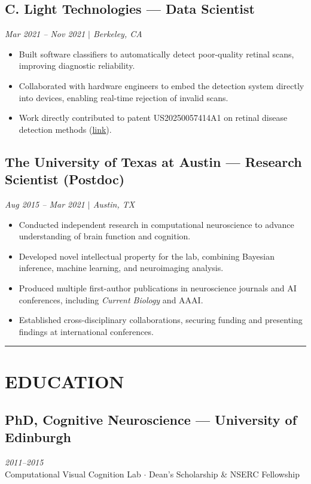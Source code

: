 \documentclass[11pt,a4paper]{article}
\newcommand{\sepline}{\noindent\rule{\textwidth}{0.5pt}\vspace{0.5em}}
\begin{document}
\subsection*{C. Light Technologies --- Data Scientist}
\textit{Mar 2021 -- Nov 2021 $\mid$ Berkeley, CA}
\begin{itemize}
    \item Built software classifiers to automatically detect poor-quality retinal scans, improving diagnostic reliability.
    \item Collaborated with hardware engineers to embed the detection system directly into devices, enabling real-time rejection of invalid scans.
    \item Work directly contributed to patent US20250057414A1 on retinal disease detection methods (\href{https://patents.google.com/patent/US20250057414A1/}{link}).
\end{itemize}

\subsection*{The University of Texas at Austin --- Research Scientist (Postdoc)}
\textit{Aug 2015 -- Mar 2021 $\mid$ Austin, TX}
\begin{itemize}
    \item Conducted independent research in computational neuroscience to advance understanding of brain function and cognition.
    \item Developed novel intellectual property for the lab, combining Bayesian inference, machine learning, and neuroimaging analysis.
    \item Produced multiple first-author publications in neuroscience journals and AI conferences, including \textit{Current Biology} and AAAI.
    \item Established cross-disciplinary collaborations, securing funding and presenting findings at international conferences.
\end{itemize}

\vspace{0.5em}
\sepline

\section*{EDUCATION}

\subsection*{PhD, Cognitive Neuroscience --- University of Edinburgh}
\textit{2011--2015}\\
Computational Visual Cognition Lab $\cdot$ Dean's Scholarship \& NSERC Fellowship
\end{document}
